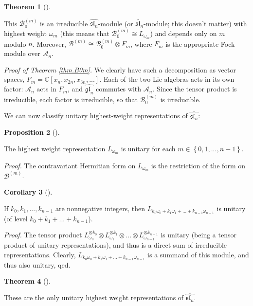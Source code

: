 \documentclass
[numbers=enddot,12pt,final,onecolumn,german,notitlepage]{scrartcl}%
\theoremstyle{definition}
\newtheorem{theo}{Theorem}
\newenvironment{theorem}[1][]
{\begin{theo}[#1]\begin{leftbar}}
{\end{leftbar}\end{theo}}
\newtheorem{prop}[theo]{Proposition}
\newenvironment{proposition}[1][]
{\begin{prop}[#1]\begin{leftbar}}
{\end{leftbar}\end{prop}}
\newtheorem{coro}[theo]{Corollary}
\newenvironment{corollary}[1][]
{\begin{coro}[#1]\begin{leftbar}}
{\end{leftbar}\end{coro}}
\begin{document}
\begin{theorem}
\label{thm.B0m}This $\mathcal{B}_{0}^{\left(  m\right)  }$ is an irreducible
$\widehat{\mathfrak{sl}_{n}}$-module (or $\widetilde{\mathfrak{sl}_{n}}%
$-module; this doesn't matter) with highest weight $\omega_{m}$ (this means
that $\mathcal{B}_{0}^{\left(  m\right)  }\cong L_{\omega_{m}}$) and depends
only on $m$ modulo $n$. Moreover, $\mathcal{B}^{\left(  m\right)  }%
\cong\mathcal{B}_{0}^{\left(  m\right)  }\otimes F_{m}$, where $F_{m}$ is the
appropriate Fock module over $\mathcal{A}_{n}$.
\end{theorem}

\textit{Proof of Theorem \ref{thm.B0m}.} We clearly have such a decomposition
as vector spaces, $F_{m}=\mathbb{C}\left[  x_{n},x_{2n},x_{3n},...\right]  $.
Each of the two Lie algebras acts in its own factor: $\mathcal{A}_{n}$ acts in
$F_{m}$, and $\widehat{\mathfrak{gl}_{n}}$ commutes with $\mathcal{A}_{n}$.
Since the tensor product is irreducible, each factor is irreducible, so that
$\mathcal{B}_{0}^{\left(  m\right)  }$ is irreducible.

We can now classify unitary highest-weight representations of
$\widehat{\mathfrak{sl}_{n}}$:

\begin{proposition}
The highest weight representation $L_{\omega_{m}}$ is unitary for each
$m\in\left\{  0,1,...,n-1\right\}  $.
\end{proposition}

\textit{Proof.} The contravariant Hermitian form on $L_{\omega_{m}}$ is the
restriction of the form on $\mathcal{B}^{\left(  m\right)  }$.

\begin{corollary}
If $k_{0},k_{1},...,k_{n-1}$ are nonnegative integers, then $L_{k_{0}%
\omega_{0}+k_{1}\omega_{1}+...+k_{n-1}\omega_{n-1}}$ is unitary (of level
$k_{0}+k_{1}+...+k_{n-1}$).
\end{corollary}

\textit{Proof.} The tensor product $L_{\omega_{0}}^{\otimes k_{0}}\otimes
L_{\omega_{1}}^{\otimes k_{1}}\otimes...\otimes L_{\omega_{n-1}}^{\otimes
k_{n-1}}$ is unitary (being a tensor product of unitary representations), and
thus is a direct sum of irreducible representations. Clearly, $L_{k_{0}%
\omega_{0}+k_{1}\omega_{1}+...+k_{n-1}\omega_{n-1}}$ is a summand of this
module, and thus also unitary, qed.

\begin{theorem}
\label{thm.sln.unitaries}These are the only unitary highest weight
representations of $\widehat{\mathfrak{sl}_{n}}$.
\end{theorem}
\end{document}
